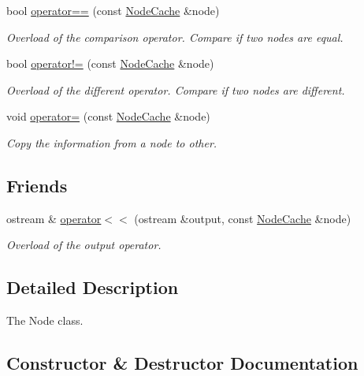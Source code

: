 \begin{DoxyCompactItemize}
bool \hyperlink{classNodeCache_aaa1cb454234f2e2485ddcda0aff3585e}{operator==} (const \hyperlink{classNodeCache}{Node\+Cache} \&node)
\begin{DoxyCompactList}\small\item\em Overload of the comparison operator. Compare if two nodes are equal. \end{DoxyCompactList}\item 
bool \hyperlink{classNodeCache_a1f82522f7c1c6bac65472eba595ddaa7}{operator!=} (const \hyperlink{classNodeCache}{Node\+Cache} \&node)
\begin{DoxyCompactList}\small\item\em Overload of the different operator. Compare if two nodes are different. \end{DoxyCompactList}\item 
void \hyperlink{classNodeCache_aea15a590ffd1d581ce889e6117daac24}{operator=} (const \hyperlink{classNodeCache}{Node\+Cache} \&node)
\begin{DoxyCompactList}\small\item\em Copy the information from a node to other. \end{DoxyCompactList}\end{DoxyCompactItemize}
\subsection*{Friends}
\begin{DoxyCompactItemize}
\item 
ostream \& \hyperlink{classNodeCache_a2d3b986da4a23b4a456738290cc0b94e}{operator$<$$<$} (ostream \&output, const \hyperlink{classNodeCache}{Node\+Cache} \&node)
\begin{DoxyCompactList}\small\item\em Overload of the output operator. \end{DoxyCompactList}\end{DoxyCompactItemize}


\subsection{Detailed Description}
The Node class. 

\subsection{Constructor \& Destructor Documentation}

